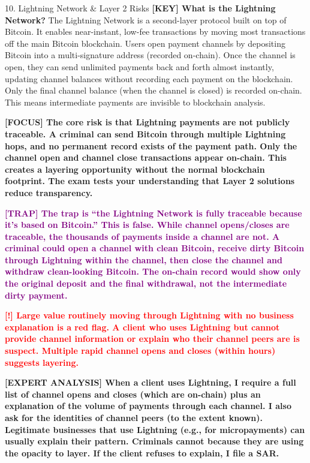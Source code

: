 \documentclass[11pt,a4paper]{beamer}
\newcommand{\redflag}[1]{\textcolor{red}{\textbf{[!] #1}}}
\newcommand{\examfocus}[1]{\textcolor{orange!80!black}{\textbf{[FOCUS] #1}}}
\newcommand{\trap}[1]{\textcolor{purple}{\textbf{[TRAP] #1}}}
\newcommand{\keyterm}[1]{\textcolor{red!80!black}{\textbf{[KEY] #1}}}
\newcommand{\expert}[1]{\textcolor{blue!70!black}{\textbf{[EXPERT ANALYSIS] #1}}}
\begin{document}
	\begin{frame}{10. Lightning Network \& Layer 2 Risks}
		\tiny
		\keyterm{What is the Lightning Network?} The Lightning Network is a second-layer protocol built on top of Bitcoin. It enables near-instant, low-fee transactions by moving most transactions off the main Bitcoin blockchain. Users open payment channels by depositing Bitcoin into a multi-signature address (recorded on-chain). Once the channel is open, they can send unlimited payments back and forth almost instantly, updating channel balances without recording each payment on the blockchain. Only the final channel balance (when the channel is closed) is recorded on-chain. This means intermediate payments are invisible to blockchain analysis.
		
		\vspace{0.1cm}
		\examfocus{The core risk is that Lightning payments are not publicly traceable. A criminal can send Bitcoin through multiple Lightning hops, and no permanent record exists of the payment path. Only the channel open and channel close transactions appear on-chain. This creates a layering opportunity without the normal blockchain footprint. The exam tests your understanding that Layer 2 solutions reduce transparency.}
		
		\vspace{0.1cm}
		\trap{The trap is “the Lightning Network is fully traceable because it's based on Bitcoin.” This is false. While channel opens/closes are traceable, the thousands of payments inside a channel are not. A criminal could open a channel with clean Bitcoin, receive dirty Bitcoin through Lightning within the channel, then close the channel and withdraw clean-looking Bitcoin. The on-chain record would show only the original deposit and the final withdrawal, not the intermediate dirty payment.}
		
		\vspace{0.1cm}
		\redflag{Large value routinely moving through Lightning with no business explanation is a red flag. A client who uses Lightning but cannot provide channel information or explain who their channel peers are is suspect. Multiple rapid channel opens and closes (within hours) suggests layering.}
		
		\vspace{0.1cm}
		\expert{When a client uses Lightning, I require a full list of channel opens and closes (which are on-chain) plus an explanation of the volume of payments through each channel. I also ask for the identities of channel peers (to the extent known). Legitimate businesses that use Lightning (e.g., for micropayments) can usually explain their pattern. Criminals cannot because they are using the opacity to layer. If the client refuses to explain, I file a SAR.}
	\end{frame}
	
\end{document}
